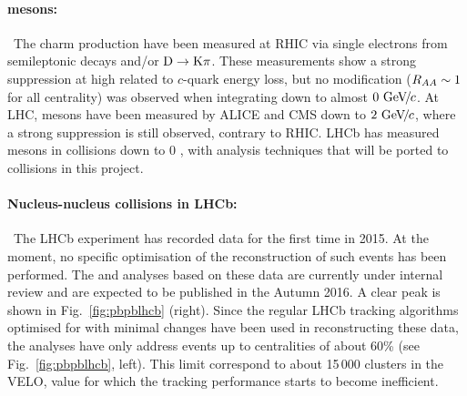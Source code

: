 \documentclass[a4paper,11pt]{article}
\begin{document}
\paragraph{\D mesons:\ }\ 
The charm production have been measured at RHIC via single
electrons from semileptonic decays and/or $\text{D} \to \text{K}\pi$. These measurements show a strong suppression at
high \pt related to $c$-quark energy loss, but no modification ($R_{AA} \sim 1$ for all centrality) was observed
when integrating down to almost $0\,{\,\text{Ge\hspace{-.08em}V\hspace{-0.16em}/\hspace{-0.08em}}c}$. 
At LHC, \D mesons have been measured by ALICE and CMS down to $2\,{\,\text{Ge\hspace{-.08em}V\hspace{-0.16em}/\hspace{-0.08em}}c}$, where
a strong suppression is still observed, contrary to RHIC. 
LHCb has measured \D mesons in \ppb collisions down to 0 \pt, with analysis techniques
that will be ported to \pbpb collisions in this project.



\paragraph{Nucleus-nucleus collisions in LHCb:\ }\ 
The LHCb experiment has recorded \pbpb data for the first time in 2015. At the moment, no specific optimisation of the reconstruction of such events has been performed. 
The \Dz and \Jpsi analyses based on these data are currently under internal review and are expected to be published in the Autumn 2016. A clear \Dz peak is shown in Fig.~\ref{fig:pbpblhcb} (right). Since the regular LHCb tracking algorithms optimised for \pp with minimal changes have been used in reconstructing these data, the analyses have only address events up to centralities of about 60\% (see Fig.~\ref{fig:pbpblhcb}, left). This limit correspond to about 15\,000 clusters in the VELO, value for which the tracking performance starts to become inefficient.
\end{document}

